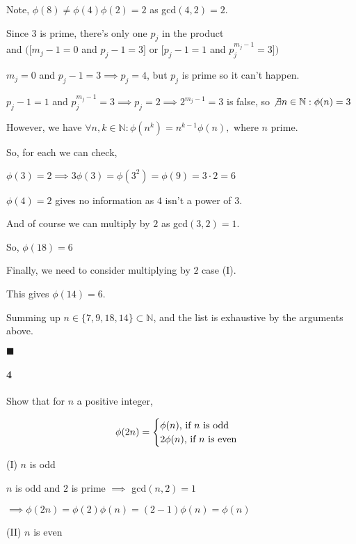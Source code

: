 \documentclass{article}
\begin{document}
Note, $\phi(8) \neq \phi(4)\phi(2) = 2$ as gcd$(4,2) = 2$.

Since $3$ is prime, there's only one $p_j$ in the product\\ and $([m_j-1 =
0$ and $p_j - 1= 3]$   or
$[p_j-1= 1$ and $p_j^{m_j-1} = 3])$

$m_j =
0$ and $p_j - 1= 3 \implies p_j = 4$, but $p_j$ is prime so it can't
happen.

$p_j-1= 1$ and $p_j^{m_j-1} = 3 \implies p_j = 2 \implies 2^{m_j-1}=3$
is false, so $\not\exists n\in \mathbb{N}: \phi(n) = 3$

However, we have $\forall n,k \in \mathbb{N}: \phi(n^k)=
n^{k−1}\phi(n),$ where $n$ prime.

So, for each we can check,

$\phi(3) = 2 \implies 3\phi(3) = \phi(3^2) = \phi(9) = 3\cdot 2 =6$

$\phi(4) = 2$ gives no information as $4$ isn't a power of $3$.

And of course we can multiply by $2$ as gcd$(3,2) = 1$.

So, $\phi(18) = 6$

Finally, we need to consider multiplying by $2$ case (I).

This gives $\phi(14)=6$.

Summing up $n \in \{7,9,18,14\}\subset \mathbb{N}$, and the list is
exhaustive by the arguments above.

\vspace{0.618 em}
$\blacksquare$

\paragraph{4} Show that for $n$ a positive integer,

\[\phi(2n) = \begin{cases}\phi(n)$, if $n$ is odd$\\
                          2\phi(n)$, if $n$ is even$\\\end{cases}\]



\vspace{0.618 em}

(I) $n$ is odd

$n$ is odd and $2$ is prime $\implies$ gcd$(n,2) = 1$

$\implies \phi(2n) = \phi(2)\phi(n) = (2-1)\phi(n) = \phi(n)$

(II) $n$ is even
\end{document}
